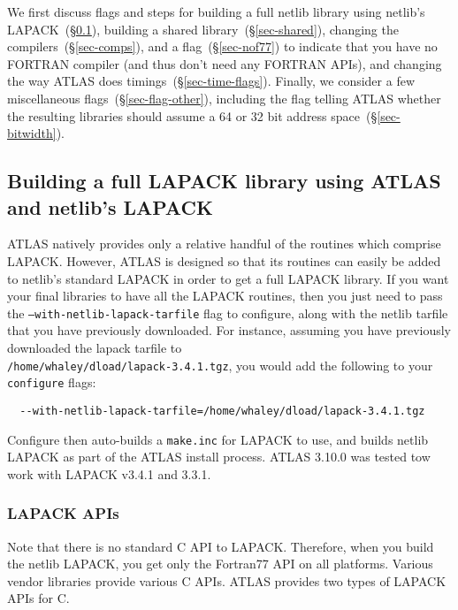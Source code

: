 \documentclass[11pt]{article}
\begin{document}
We first discuss flags and steps for building a full netlib library
using netlib's LAPACK~(\S\ref{sec-lapack}), 
building a shared library~(\S\ref{sec-shared}),
changing the compilers~(\S\ref{sec-comps}), and 
a flag~(\S\ref{sec-nof77}) to indicate that you have no FORTRAN compiler 
(and thus don't need any FORTRAN APIs), and changing the way ATLAS
does timings~(\S\ref{sec-time-flags}). 
Finally, we consider a few
miscellaneous flags~(\S\ref{sec-flag-other}), including the flag telling
ATLAS whether the resulting libraries should assume a 64 or 32 bit
address space~(\S\ref{sec-bitwidth}).

\subsection{Building a full LAPACK library using ATLAS and netlib's LAPACK}
\label{sec-lapack}
ATLAS natively provides only a relative handful of the routines which comprise
LAPACK.  However, ATLAS is designed so that its routines can easily be
added to netlib's standard LAPACK in order to get a full LAPACK library.
If you want your final libraries to have all the LAPACK routines,
then you just need to pass the {\tt --with-netlib-lapack-tarfile} flag
to configure, along with the netlib tarfile that you have previously
downloaded.  For instance, assuming you have previously downloaded
the lapack tarfile to \\
{\tt /home/whaley/dload/lapack-3.4.1.tgz}, you
would add the following to your {\tt configure} flags:
\begin{verbatim}
  --with-netlib-lapack-tarfile=/home/whaley/dload/lapack-3.4.1.tgz
\end{verbatim}

Configure then auto-builds a {\tt make.inc} for LAPACK to use,
and builds netlib LAPACK as part of the ATLAS install process.
ATLAS 3.10.0 was tested tow work with LAPACK v3.4.1 and 3.3.1.

\subsubsection{LAPACK APIs}
Note that there is no standard C API to LAPACK.  Therefore, when
you build the netlib LAPACK, you get only the Fortran77 API on
all platforms.  Various vendor libraries provide various C APIs.
ATLAS provides two types of LAPACK APIs for C.
\end{document}
